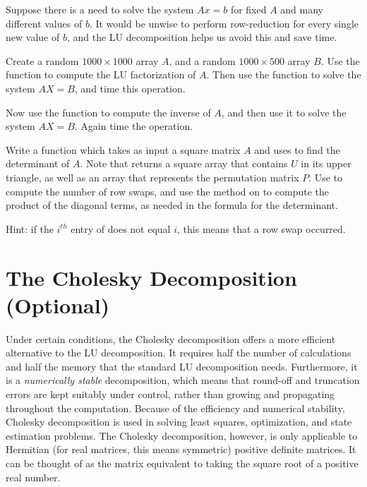 \begin{problem}
\label{prob:Solve}
Suppose there is a need to solve the system $Ax = b$ for fixed $A$ and many different values of $b$. It would be unwise to perform row-reduction for every single new value of $b$, and the LU decomposition helps us avoid this and save time.

Create a random $1000 \times 1000$ array $A$, and a random $1000 \times 500$ array $B$. Use the  function to compute the LU factorization of $A$. Then use the  function to solve the system $AX = B$, and time this operation. 

Now use the  function to compute the inverse of $A$, and then use it to solve the system $AX = B$. Again time the operation. 

\end{problem}

%

\begin{problem}
\label{prob:det}
Write a function which takes as input a square matrix $A$ and uses  to find the determinant of $A$. Note that  returns a square array  that contains $U$ in its upper triangle, as well as an array  that represents the 
permutation matrix $P$. Use  to compute the number of row swaps, and use the  method on  to compute the product of the diagonal terms, as needed in the formula for the determinant.

Hint: if the $i^{th}$ entry of  does not equal $i$, this means that a row swap occurred.
\end{problem}

\section*{The Cholesky Decomposition (Optional)}

Under certain conditions, the Cholesky decomposition offers a more efficient alternative to the LU decomposition.
It requires half the number of calculations and half the memory that the standard LU decomposition needs.
Furthermore, it is a \emph{numerically stable} decomposition, which means that round-off and truncation errors are kept suitably under control, rather than growing and propagating throughout the computation.
Because of the efficiency and numerical stability, Cholesky decomposition is used in solving least squares, optimization, and state estimation problems.
The Cholesky decomposition, however, is only applicable to Hermitian (for real matrices, this means symmetric) positive definite matrices.
It can be thought of as the matrix equivalent to taking the square root of a positive real number.

